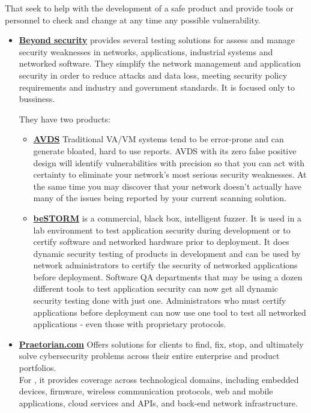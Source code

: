 That seek to help with the development of a safe product and provide tools or personnel to check and change at any time any possible vulnerability.
\begin{itemize}
	\item \textbf{\href{http://www.beyondsecurity.com}{Beyond security}}
	provides several testing solutions for assess and manage security weaknesses in networks, applications, industrial systems and networked software. They simplify the network management and application security in order to reduce attacks and data loss, meeting security policy requirements and industry and government standards. It is focused only to bussiness. 
	
	They have two products:
	
	\begin{itemize}
		\item \textbf{\href{http://www.beyondsecurity.com/avds.html}{AVDS}} Traditional VA/VM systems tend to be error-prone and can generate bloated, hard to use reports. AVDS with its zero false positive design will identify vulnerabilities with precision so that you can act with certainty to eliminate your network's most serious security weaknesses. At the same time you may discover that your network doesn't actually have many of the issues being reported by your current scanning solution.
		
		\item \textbf{\href{http://www.beyondsecurity.com/bestorm.html}{beSTORM}} is a commercial, black box, intelligent fuzzer. It is used in a lab environment to test application security during development or to certify software and networked hardware prior to deployment. It does dynamic security testing of products in development and can be used by network administrators to certify the security of networked applications before deployment. Software QA departments that may be using a dozen different tools to test application security can now get all dynamic security testing done with just one. Administrators who must certify applications before deployment can now use one tool to test all networked applications - even those with proprietary protocols. 		
	\end{itemize}
	
	\item \href{https://www.praetorian.com/}{\textbf{Praetorian.com}} Offers solutions for clients to find, fix, stop, and ultimately solve cybersecurity problems across their entire enterprise and product portfolios.\\
	For \IoT, it provides coverage across technological domains, including embedded devices, firmware, wireless communication protocols, web and mobile applications, cloud services and APIs, and back-end network infrastructure.


\end{itemize}
